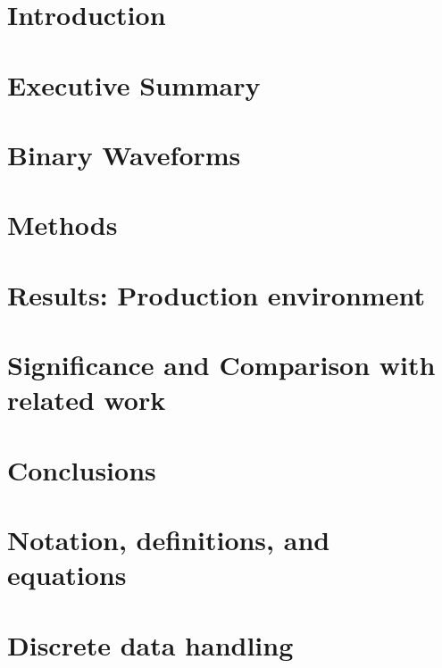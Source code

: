 \documentclass[twocolumn,prd,nofootinbib]{revtex4}
\newcommand\ForInternalReference[1]{}
\begin{document}
\section{Introduction}


\section{Executive Summary}


\section{Binary Waveforms}


\section{Methods}


\section{Results: Production environment}


\section{Significance and Comparison with related work }


\section{Conclusions}


\appendix

\section{Notation, definitions, and equations}


\section{Discrete data handling}


\ForInternalReference{

}


\end{document}

